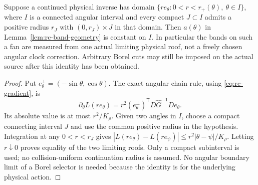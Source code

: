 \begin{proposition}
\label{prop:rc-critical-roof-constancy}
Suppose a continued physical inverse has domain
$\{re_\theta:0<r<r_+(\theta),\ \theta\in I\}$, where $I$ is a
connected angular interval and every compact $J\subset I$ admits a
positive radius $r_J$ with $(0,r_J)\times J$ in that domain. Then
$a(\theta)$ in Lemma~\ref{lem:rc-band-geometry} is constant on $I$.
In particular the bands on such a fan are measured from one actual
limiting physical roof, not a freely chosen angular clock correction.
Arbitrary Borel cuts may still be imposed on the actual source after
this identity has been obtained.
\end{proposition}
\begin{proof}
Put $e_\theta^\perp=(-\sin\theta,\cos\theta)$. The exact angular
chain rule, using \eqref{eq:rc-gradient}, is
\[
 \partial_\theta L(re_\theta)
   =r^2(e_\theta^\perp)^{\mathsf T}
                         D\widehat G^{-1}D e_\theta .
\]
Its absolute value is at most $r^2/K_\rho$. Given two angles in $I$,
choose a compact connecting interval $J$ and use the common positive
radius in the hypothesis. Integration at any $0<r<r_J$ gives
$|L(re_\theta)-L(re_\psi)|\le r^2|\theta-\psi|/K_\rho$.
Letting $r\downarrow0$ proves equality of the two limiting roofs.
Only a compact subinterval is used; no collision-uniform continuation
radius is assumed. No angular boundary limit of a Borel selector is
needed because the identity is for the underlying physical action.
\end{proof}

